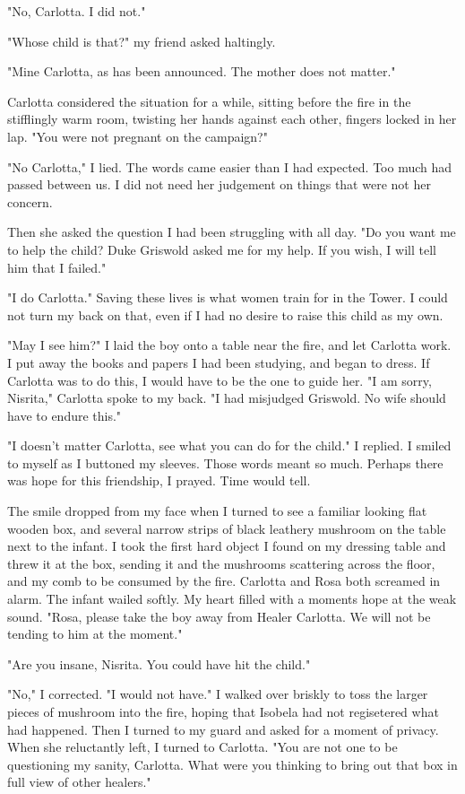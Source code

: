 \documentclass{article}
\begin{document}
"No, Carlotta. I did not."

"Whose child is that?" my friend asked haltingly.

"Mine Carlotta, as has been announced. The mother does not matter."

Carlotta considered the situation for a while, sitting before the fire in the stifflingly warm room, twisting her hands against each other, fingers locked in her lap. "You were not pregnant on the campaign?"

"No Carlotta," I lied. The words came easier than I had expected. Too much had passed between us. I did not need her judgement on things that were not her concern.

Then she asked the question I had been struggling with all day. "Do you want me to help the child? Duke Griswold asked me for my help. If you wish, I will tell him that I failed."

"I do Carlotta." Saving these lives is what women train for in the Tower. I could not turn my back on that, even if I had no desire to raise this child as my own. 

"May I see him?" I laid the boy onto a table near the fire, and let Carlotta work. I put away the books and papers I had been studying, and began to dress. If Carlotta was to do this, I would have to be the one to guide her. "I am sorry, Nisrita," Carlotta spoke to my back. "I had misjudged Griswold. No wife should have to endure this."

"I doesn't matter Carlotta, see what you can do for the child." I replied. I smiled to myself as I buttoned my sleeves. Those words meant so much. Perhaps there was hope for this friendship, I prayed. Time would tell. 

The smile dropped from my face when I turned to see a familiar looking flat wooden box, and several narrow strips of black leathery mushroom on the table next to the infant. I took the first hard object I found on my dressing table and threw it at the box, sending it and the mushrooms scattering across the floor, and my comb to be consumed by the fire. Carlotta and Rosa both screamed in alarm. The infant wailed softly. My heart filled with a moments hope at the weak sound. "Rosa, please take the boy away from Healer Carlotta. We will not be tending to him at the moment."

"Are you insane, Nisrita. You could have hit the child." 

"No," I corrected. "I would not have." I walked over briskly to toss the larger pieces of mushroom into the fire, hoping that Isobela had not regisetered what had happened. Then I turned to my guard and asked for a moment of privacy. When she reluctantly left, I turned to Carlotta. "You are not one to be questioning my sanity, Carlotta. What were you thinking to bring out that box in full view of other healers."
\end{document}
